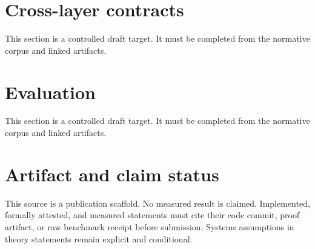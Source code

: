 \documentclass[11pt]{article}
\begin{document}
\section{Cross-layer contracts}
This section is a controlled draft target. It must be completed from the normative corpus and linked artifacts.

\section{Evaluation}
This section is a controlled draft target. It must be completed from the normative corpus and linked artifacts.

\section*{Artifact and claim status}
This source is a publication scaffold. No measured result is claimed. Implemented,
formally attested, and measured statements must cite their code commit, proof
artifact, or raw benchmark receipt before submission. Systems assumptions in
theory statements remain explicit and conditional.
\end{document}
